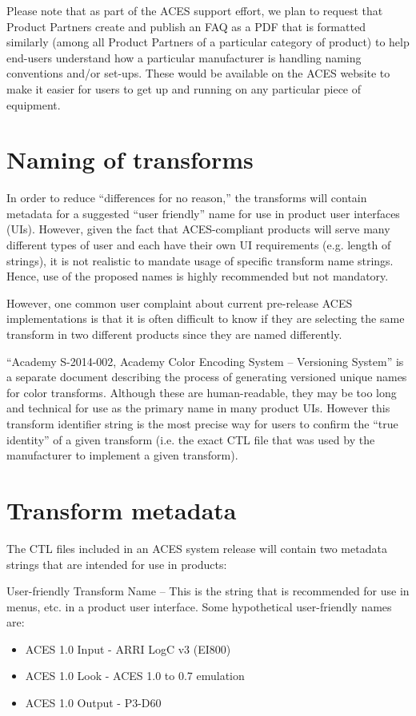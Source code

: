 Please note that as part of the ACES support effort, we plan to request that Product Partners create and publish an FAQ as a PDF that is formatted similarly (among all Product Partners of a particular category of product) to help end-users understand how a particular manufacturer is handling naming conventions and/or set-ups. These would be available on the ACES website to make it easier for users to get up and running on any particular piece of equipment.

\section{Naming of transforms}
In order to reduce ``differences for no reason,'' the transforms will contain metadata for a suggested ``user friendly'' name for use in product user interfaces (UIs). However, given the fact that ACES-compliant products will serve many different types of user and each have their own UI requirements (e.g. length of strings), it is not realistic to mandate usage of specific transform name strings. Hence, use of the proposed names is highly recommended but not mandatory.

However, one common user complaint about current pre-release ACES implementations is that it is often difficult to know if they are selecting the same transform in two different products since they are named differently.

``Academy S-2014-002, Academy Color Encoding System -- Versioning System'' is a separate document describing the process of generating versioned unique names for color transforms. Although these are human-readable, they may be too long and technical for use as the primary name in many product UIs. However this transform identifier string is the most precise way for users to confirm the ``true identity'' of a given transform (i.e. the exact CTL file that was used by the manufacturer to implement a given transform).

\section{Transform metadata}
The CTL files included in an ACES system release will contain two metadata strings that are intended for use in products:

User-friendly Transform Name -- This is the string that is recommended for use in menus, etc. in a product user interface. Some hypothetical user-friendly names are:

\begin{itemize}
	\item ACES 1.0 Input - ARRI LogC v3 (EI800)
	\item ACES 1.0 Look - ACES 1.0 to 0.7 emulation
	\item ACES 1.0 Output - P3-D60
\end{itemize}

